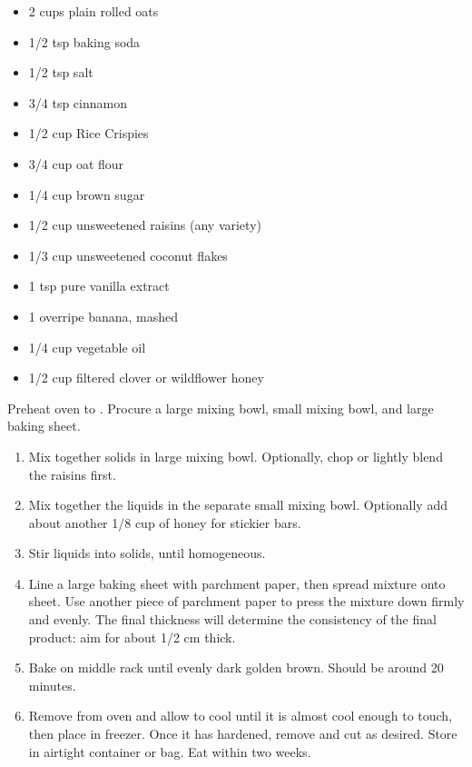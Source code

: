 \documentclass{article}
\begin{document}
\thispagestyle{firstpage}

\ingredients
\begin{multicols}{2}
\ingredients[Solids]
\begin{itemize}
    \item 2 cups plain rolled oats
    \item 1/2 tsp baking soda
    \item 1/2 tsp salt
    \item 3/4 tsp cinnamon
    \item 1/2 cup Rice Crispies
    \item 3/4 cup oat flour
    \item 1/4 cup brown sugar
    \item 1/2 cup unsweetened raisins (any variety)
    \item 1/3 cup unsweetened coconut flakes
\end{itemize}
\columnbreak
\ingredients[Liquids]
\begin{itemize}
    \item 1 tsp pure vanilla extract
    \item 1 overripe banana, mashed
    \item 1/4 cup vegetable oil
    \item 1/2 cup filtered clover or wildflower honey
\end{itemize}
\end{multicols}

\instructions
Preheat oven to . Procure a large mixing bowl, small mixing bowl, and large baking sheet.
\begin{enumerate}
    \item Mix together solids in large mixing bowl. Optionally, chop or lightly blend the raisins first.
    \item Mix together the liquids in the separate small mixing bowl. Optionally add about another 1/8 cup of honey for stickier bars.
    \item Stir liquids into solids, until homogeneous.
    \item Line a large baking sheet with parchment paper, then spread mixture onto sheet. Use another piece of parchment paper to press the mixture down firmly and evenly. The final thickness will determine the consistency of the final product: aim for about 1/2 cm thick.
    \item Bake on middle rack until evenly dark golden brown. Should be around 20 minutes.
    \item Remove from oven and allow to cool until it is almost cool enough to touch, then place in freezer. Once it has hardened, remove and cut as desired. Store in airtight container or bag. Eat within two weeks.
\end{enumerate}
\end{document}
